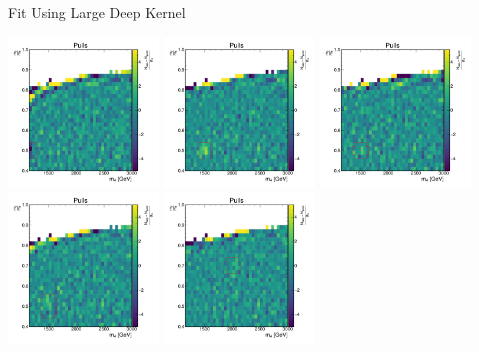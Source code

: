 \documentclass[10pt]{beamer}
\begin{document}
\begin{frame}{Fit Using Large Deep Kernel}
  \begin{center}
    \includegraphics[width=0.3\textwidth]{figures/2dpullplots/nnrbf_256_128_16/E_1200_0p5_100_0p05.pdf} 
    \includegraphics[width=0.3\textwidth]{figures/2dpullplots/nnrbf_256_128_16/E_1500_0p5_100_0p05.pdf} 
    \includegraphics[width=0.3\textwidth]{figures/2dpullplots/nnrbf_256_128_16/E_1500_0p5_150_0p05.pdf} 
    \includegraphics[width=0.3\textwidth]{figures/2dpullplots/nnrbf_256_128_16/E_1500_0p5_150_0p07.pdf} 
    \includegraphics[width=0.3\textwidth]{figures/2dpullplots/nnrbf_256_128_16/E_2000_0p7_150_0p05.pdf} 

\end{center}
\end{frame}
\end{document}
